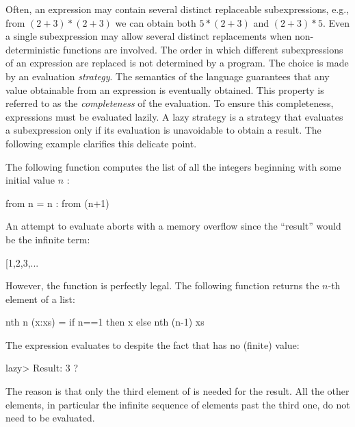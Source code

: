 Often, an expression may contain several distinct replaceable subexpressions,
e.g., from $(2+3)*(2+3)$ we can obtain both $5*(2+3)$ and $(2+3)*5$.
Even a single subexpression may allow several distinct replacements
when non-deterministic functions are involved.
The order in which different subexpressions of an expression are
replaced is not determined by a program.
The choice is made by an evaluation
\emph{strategy}.
The semantics of the language guarantees that any
value obtainable from an expression is eventually obtained.
This property is referred to as the
\emph{completeness}
of the evaluation.
To ensure this completeness, expressions must be evaluated
lazily.
A lazy strategy is a strategy that evaluates a subexpression
only if its evaluation is unavoidable to obtain a result.
The following example clarifies this delicate point.

The following function computes the list of
all the integers beginning with some initial value $n$
:
%
\begin{prog}
from n = n : from (n+1)
\end{prog}
%
An attempt to evaluate  aborts with a
memory overflow since the ``result'' would be the infinite term:
%
\begin{prog}
[1,2,3,...
\end{prog}
%
However, the function  is perfectly legal.
The following function returns the $n$-th element of a list:
%
\begin{prog}
nth n (x:xs) = if n==1 then x else nth (n-1) xs
\end{prog}
%
The expression  evaluates to 
despite the fact that  has no (finite) value:
%
\begin{prog}
lazy> 
Result: 3 ? 
\end{prog}
%
The reason is that only the third element of  
is needed for the result.
All the other elements, in particular the infinite sequence
of elements past the third one, do not need to be evaluated.

